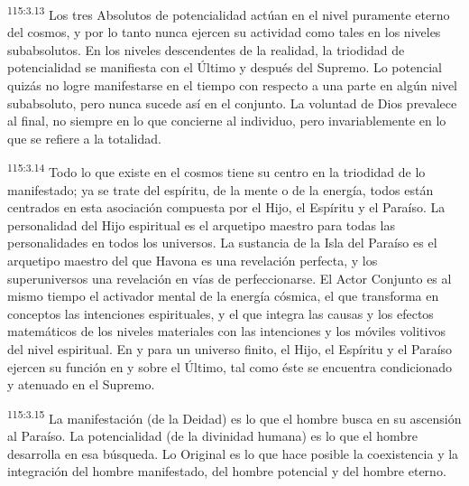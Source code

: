 \par
\textsuperscript{115:3.13} Los tres Absolutos de potencialidad actúan en el nivel puramente eterno del cosmos, y por lo tanto nunca ejercen su actividad como tales en los niveles subabsolutos. En los niveles descendentes de la realidad, la triodidad de potencialidad se manifiesta con el Último y después del Supremo. Lo potencial quizás no logre manifestarse en el tiempo con respecto a una parte en algún nivel subabsoluto, pero nunca sucede así en el conjunto. La voluntad de Dios prevalece al final, no siempre en lo que concierne al individuo, pero invariablemente en lo que se refiere a la totalidad.

\par
\textsuperscript{115:3.14} Todo lo que existe en el cosmos tiene su centro en la triodidad de lo manifestado; ya se trate del espíritu, de la mente o de la energía, todos están centrados en esta asociación compuesta por el Hijo, el Espíritu y el Paraíso. La personalidad del Hijo espiritual es el arquetipo maestro para todas las personalidades en todos los universos. La sustancia de la Isla del Paraíso es el arquetipo maestro del que Havona es una revelación perfecta, y los superuniversos una revelación en vías de perfeccionarse. El Actor Conjunto es al mismo tiempo el activador mental de la energía cósmica, el que transforma en conceptos las intenciones espirituales, y el que integra las causas y los efectos matemáticos de los niveles materiales con las intenciones y los móviles volitivos del nivel espiritual. En y para un universo finito, el Hijo, el Espíritu y el Paraíso ejercen su función en y sobre el Último, tal como éste se encuentra condicionado y atenuado en el Supremo.

\par
\textsuperscript{115:3.15} La manifestación (de la Deidad) es lo que el hombre busca en su ascensión al Paraíso. La potencialidad (de la divinidad humana) es lo que el hombre desarrolla en esa búsqueda. Lo Original es lo que hace posible la coexistencia y la integración del hombre manifestado, del hombre potencial y del hombre eterno.

